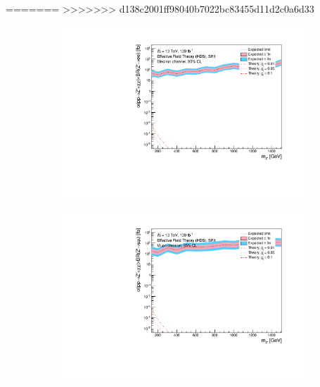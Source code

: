 \documentclass[12pt, a4paper]{book}
\begin{document}
=======
>>>>>>> d138c2001ff98040b7022bc83455d11d2c0a6d33
\begin{figure}[!ht]
	\centering
	\begin{subfigure}[b]{0.49\textwidth}
      \centering
      \includegraphics[width=1\textwidth]{Limits/Model_independent/50-100/EFT_HDS/mass_exclusion_ee.pdf}
   \end{subfigure}
   \hfill
   \begin{subfigure}[b]{0.49\textwidth}
      \centering
      \includegraphics[width=1\textwidth]{Limits/Model_independent/50-100/EFT_HDS/mass_exclusion_uu.pdf}
   \end{subfigure}
   \hfill
   \begin{subfigure}[b]{0.49\textwidth}
      \centering

\end{subfigure}
\end{figure}
\end{document}

